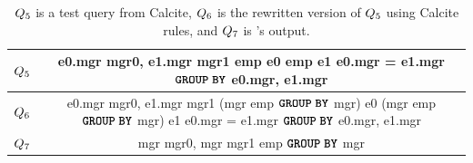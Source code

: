 \begin{table}[!t]
\footnotesize
\caption{$Q_5$ is a test query from Calcite, 
$Q_6$ is the rewritten version of $Q_5$ using Calcite rules, and
$Q_7$ is \slabcity's output.}
\vspace{-8pt}
\begin{tabular}{|c|c|}
 \hline
 $Q_5$ 

 & 
 
 \makecell[l]{\sqlselectcolor e0.mgr \sqlascolor mgr0, e1.mgr \sqlascolor mgr1 \\
             \sqlfromcolor emp \sqlascolor e0 \sqlfulljoincolor emp \sqlascolor e1 \sqloncolor e0.mgr = e1.mgr\\
              ${\color{black}{{\textbf{\texttt{GROUP}}\;\textbf{\texttt{BY}}}}}$ e0.mgr, e1.mgr
              }  
\\

\hline

 $Q_6$ 

 & 
 
 \makecell[l]{\sqlselectcolor e0.mgr \sqlascolor mgr0, e1.mgr \sqlascolor mgr1 \\
             \sqlfromcolor (\sqlselectcolor mgr \sqlfromcolor emp ${\color{black}{{\textbf{\texttt{GROUP}}\;\textbf{\texttt{BY}}}}}$ mgr) \sqlascolor e0\\
            \hspace{1em} \sqlfulljoincolor (\sqlselectcolor mgr \sqlfromcolor emp ${\color{black}{{\textbf{\texttt{GROUP}}\;\textbf{\texttt{BY}}}}}$ mgr)  \sqlascolor e1 \\
            \hspace{1em} \sqloncolor e0.mgr = e1.mgr\\
              ${\color{black}{{\textbf{\texttt{GROUP}}\;\textbf{\texttt{BY}}}}}$ e0.mgr, e1.mgr
              }  
\\

\hline

 $Q_7$ 

&

 \makecell[l]{\sqlselectcolor mgr \sqlascolor mgr0, mgr \sqlascolor mgr1 \\
             \sqlfromcolor emp \\ ${\color{black}{{\textbf{\texttt{GROUP}}\;\textbf{\texttt{BY}}}}}$ mgr
              }  
\\
 \hline
\end{tabular}


\vs
\label{slab:tab:Q5-Q7} 
\vspace{5pt}
\end{table}

